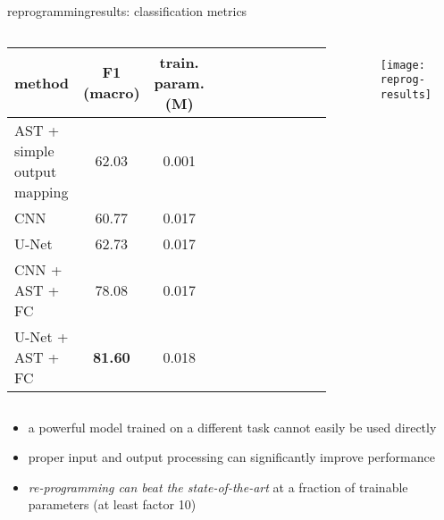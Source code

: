 \begin{frame}{reprogramming}{results: classification metrics}
		\vspace{-5mm}
    \begin{columns}
    \begin{footnotesize}
    \begin{table}[]
        \centering
        \begin{tabular}{l | c | c c c c c c c c c}
           method & F1 (macro) & train. param. (M) \\
           \hline
            AST + simple output mapping & 62.03 & 0.001\\
            CNN & 60.77 & 0.017\\
            U-Net & 62.73 & 0.017\\
            CNN + AST + FC & 78.08 & 0.017\\
            U-Net + AST + FC & \textbf{81.60} & 0.018
           
        \end{tabular}
    \end{table}
    \end{footnotesize}
    \begin{figure}%
    \texttt{[image: reprog-results]}%
    \end{figure}
    \end{columns}
		
    \bigskip
    \bigskip
    \begin{itemize}
        \item   a powerful model trained on a different task cannot easily be used directly \cite{chen_music_2023}
        \item   proper input and output processing can significantly improve performance
        \item   \textit{re-programming can beat the state-of-the-art} at a fraction of trainable parameters (at least factor 10)
    \end{itemize}
\end{frame}

